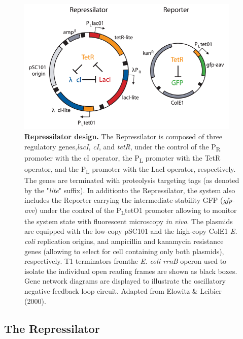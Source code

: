 \documentclass[runningheads,a4paper]{llncs}
\begin{document}
\begin{figure}[H]
    \singlespacing
    \centering
    \includegraphics[width=0.95\textwidth]{fig/Repressilator_plasmid.png}
    \caption{\textbf{Repressilator design.} The Repressilator is composed of three regulatory genes,\linebreak \textit{lacI}, \textit{cI}, and \textit{tetR}, under the control of the P\textsubscript{R} promoter with the cI operator, the P\textsubscript{L} promoter with the TetR operator, and the P\textsubscript{L} promoter with the LacI operator, respectively. The genes are terminated with proteolysis targeting tags (as denoted by the "\textit{lite}" suffix). In addition\linebreak to the Repressilator, the system also includes the Reporter carrying the intermediate-stability GFP (\textit{gfp-avv}) under the control of the P\textsubscript{L}tetO1 promoter allowing to monitor the system state with fluorescent microscopy \textit{in vivo}. The plasmids are equipped with the low-copy pSC101 and the high-copy ColE1 \textit{E. coli} replication origins, and ampicillin and kanamycin resistance genes (allowing to select for cell containing only both plasmids), respectively. T1 terminators from\linebreak the \textit{E. coli rrnB} operon used to isolate the individual open reading frames are shown as black boxes. Gene network diagrams are displayed to illustrate the oscillatory negative-feedback loop circuit. Adapted from Elowitz \& Leibier (2000)\cite{Elowitz2000d}.}
    \label{fig:fig1}
\end{figure}

\subsection*{The Repressilator}
\end{document}
